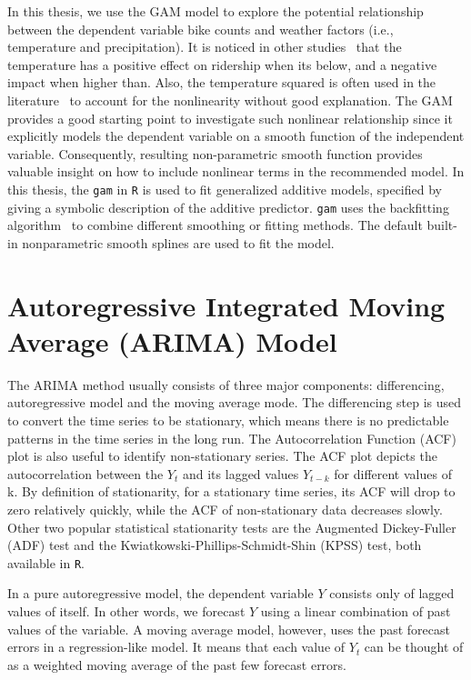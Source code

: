 \documentclass [11pt, proquest] {uwthesis}[2015/03/03]
\begin{document}
In this thesis, we use the GAM model to explore the potential relationship between the dependent variable bike counts and weather factors (i.e., temperature and precipitation). It is noticed in other studies~\cite{} that the temperature has a positive effect on ridership when its below, and a negative impact when higher than. Also, the temperature squared is often used in the literature~\cite{} to account for the nonlinearity without good explanation. The GAM provides a good starting point to investigate such nonlinear relationship since it explicitly models the dependent variable on a smooth function of the independent variable. Consequently, resulting non-parametric smooth function provides valuable insight on how to include nonlinear terms in the recommended model. In this thesis, the \texttt{gam} in \texttt{R} is used to fit generalized additive models, specified by giving a symbolic description of the additive predictor. \texttt{gam} uses the backfitting algorithm~\cite{} to combine different smoothing or fitting methods. The default built-in nonparametric smooth splines are used to fit the model. 

\section{Autoregressive Integrated Moving Average (ARIMA) Model}
\label{arimaintro}

The ARIMA method usually consists of three major components: differencing, autoregressive model and the moving average mode. The differencing step is used to convert the time series to be stationary, which means there is no predictable patterns in the time series in the long run. The Autocorrelation Function (ACF) plot is also useful to identify non-stationary series. The ACF plot depicts the autocorrelation between the $Y_t$ and its lagged values $Y_{t-k}$ for different values of k. By definition of stationarity, for a stationary time series, its ACF will drop to zero relatively quickly, while the ACF of non-stationary data decreases slowly. Other two popular statistical stationarity tests are the Augmented Dickey-Fuller (ADF) test and the Kwiatkowski-Phillips-Schmidt-Shin (KPSS) test, both available in \texttt{R}.

In a pure autoregressive model, the dependent variable $Y$ consists only of lagged values of itself. In other words, we forecast $Y$ using a linear combination of past values of the variable. A moving average model, however, uses the past forecast errors in a regression-like model. It means that each value of $Y_t$ can be thought of as a weighted moving average of the past few forecast errors. 
\end{document}
